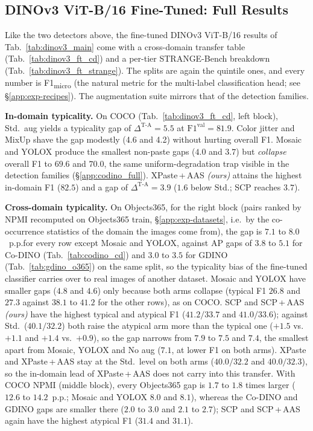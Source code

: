 \subsection{DINOv3 ViT-B/16 Fine-Tuned: Full Results}
\label{app:dinov3_full}

Like the two detectors above, the fine-tuned DINOv3 ViT-B/16 results of Tab.~\ref{tab:dinov3_main} come with a cross-domain transfer table (Tab.~\ref{tab:dinov3_ft_cd}) and a per-tier STRANGE-Bench breakdown (Tab.~\ref{tab:dinov3_ft_strange}). The splits are again the quintile ones, and every number is F1\textsubscript{micro} (the natural metric for the multi-label classification head; see \S\ref{app:exp-recipes}). The augmentation suite mirrors that of the detection families.

\noindent\textbf{In-domain typicality.}
On COCO (Tab.~\ref{tab:dinov3_ft_cd}, left block), Std.\ aug yields a typicality gap of $\Delta^{\text{T-A}} = {}$$5.5$ at $\text{F1}^{\text{val}} = {}$$81.9$. Color jitter and MixUp shave the gap modestly (4.6 and 4.2) without hurting overall F1. Mosaic and YOLOX produce the smallest non-paste gaps ($4.0$ and $3.7$) but \emph{collapse} overall F1 to $69.6$ and $70.0$, the same uniform-degradation trap visible in the detection families (\S\ref{app:codino_full}). XPaste\,+\,AAS \emph{(ours)} attains the highest in-domain F1 ($82.5$) and a gap of $\Delta^{\text{T-A}} = 3.9$ ($1.6$ below Std.; SCP reaches $3.7$).

\noindent\textbf{Cross-domain typicality.}
On Objects365, for the right block (pairs ranked by NPMI recomputed on Objects365 train, \S\ref{app:exp-datasets}, i.e.\ by the co-occurrence statistics of the domain the images come from), the gap is $7.1$ to $8.0$~p.p.\@ for every row except Mosaic and YOLOX, against AP gaps of $3.8$ to $5.1$ for Co-DINO (Tab.~\ref{tab:codino_cd}) and $3.0$ to $3.5$ for GDINO (Tab.~\ref{tab:gdino_o365}) on the same split, so the typicality bias of the fine-tuned classifier carries over to real images of another dataset. Mosaic and YOLOX have smaller gaps ($4.8$ and $4.6$) only because both arms collapse (typical F1 $26.8$ and $27.3$ against $38.1$ to $41.2$ for the other rows), as on COCO. SCP and SCP\,+\,AAS \emph{(ours)} have the highest typical and atypical F1 ($41.2 / 33.7$ and $41.0 / 33.6$); against Std.\ ($40.1 / 32.2$) both raise the atypical arm more than the typical one ($+1.5$ vs.\ $+1.1$ and $+1.4$ vs.\ $+0.9$), so the gap narrows from $7.9$ to $7.5$ and $7.4$, the smallest apart from Mosaic, YOLOX and No aug ($7.1$, at lower F1 on both arms). XPaste and XPaste\,+\,AAS stay at the Std.\ level on both arms ($40.0 / 32.2$ and $40.0 / 32.3$), so the in-domain lead of XPaste\,+\,AAS does not carry into this transfer. With COCO NPMI (middle block), every Objects365 gap is $1.7$ to $1.8$ times larger ($12.6$ to $14.2$~p.p.\@; Mosaic and YOLOX $8.0$ and $8.1$), whereas the Co-DINO and GDINO gaps are smaller there ($2.0$ to $3.0$ and $2.1$ to $2.7$); SCP and SCP\,+\,AAS again have the highest atypical F1 ($31.4$ and $31.1$).

